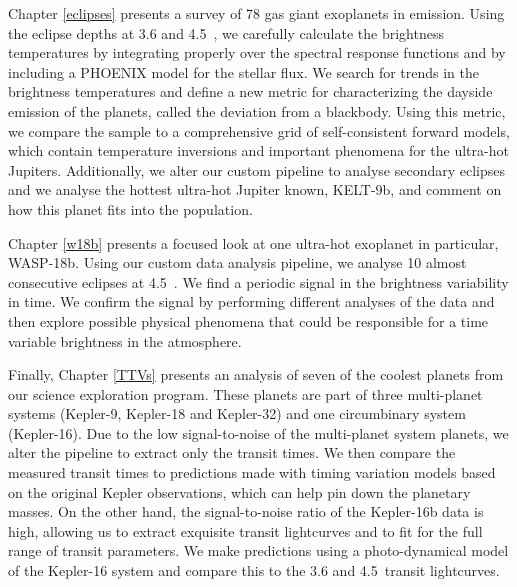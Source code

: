 Chapter \ref{eclipses} presents a survey of 78 gas giant exoplanets in emission. Using the eclipse depths at 3.6 and 4.5~\um, we carefully calculate the brightness temperatures by integrating properly over the \spitzer spectral response functions and by including a PHOENIX model for the stellar flux. We search for trends in the brightness temperatures and define a new metric for characterizing the dayside emission of the planets, called the deviation from a blackbody. Using this metric, we compare the sample to a comprehensive grid of self-consistent forward models, which contain temperature inversions and important phenomena for the ultra-hot Jupiters. Additionally, we alter our custom pipeline to analyse secondary eclipses and we analyse the hottest ultra-hot Jupiter known, KELT-9b, and comment on how this planet fits into the population.

Chapter \ref{w18b} presents a focused look at one ultra-hot exoplanet in particular, WASP-18b. Using our custom data analysis pipeline, we analyse 10 almost consecutive eclipses at 4.5~\um. We find a periodic signal in the brightness variability in time. We confirm the signal by performing different analyses of the data and then explore possible physical phenomena that could be responsible for a time variable brightness in the atmosphere.

Finally, Chapter \ref{TTVs} presents an analysis of seven of the coolest planets from our science exploration program. These planets are part of three multi-planet systems (Kepler-9, Kepler-18 and Kepler-32) and one circumbinary system (Kepler-16). Due to the low signal-to-noise of the multi-planet system planets, we alter the pipeline to extract only the transit times. We then compare the measured transit times to predictions made with timing variation models based on the original Kepler observations, which can help pin down the planetary masses. On the other hand, the signal-to-noise ratio of the Kepler-16b data is high, allowing us to extract exquisite transit lightcurves and to fit for the full range of transit parameters. We make predictions using a photo-dynamical model of the Kepler-16 system and compare this to the 3.6 and 4.5~\um transit lightcurves.

